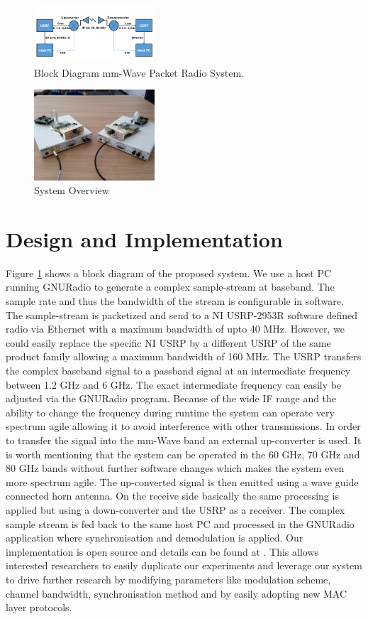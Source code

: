\documentclass{acm_proc_article-sp}
\begin{document}
\begin{figure}
\center
\includegraphics[width=0.4\textwidth]{block-diagram}
\caption{Block Diagram mm-Wave Packet Radio System.}
\label{fig:block}
\end{figure}
\begin{figure}
\center
\includegraphics[width=0.4\textwidth]{system}
\caption{System Overview}
\label{fig:system}
\end{figure}

\balancecolumns
\section{Design and Implementation}
Figure \ref{fig:block} shows a block diagram of the proposed system. 
We use a host PC running GNURadio \cite{gnuradio} to generate a complex sample-stream at baseband. The sample rate and thus the bandwidth of the stream is configurable in software. The sample-stream is packetized and send to a NI USRP-2953R \cite{ettus} software defined radio via Ethernet with a maximum bandwidth of upto 40 MHz. However, we could easily replace the specific NI USRP by a different USRP of the same product family allowing a maximum bandwidth of 160 MHz.
The USRP transfers the complex baseband signal to a passband signal at an intermediate frequency between 1.2 GHz and 6 GHz. The exact intermediate frequency can easily be adjusted via the GNURadio program. Because of the wide IF range and the ability to change the frequency during runtime the system can operate very spectrum agile allowing it to avoid interference with other transmissions.
In order to transfer the signal into the mm-Wave band an external up-converter is used. It is worth mentioning that the system can be operated in the 60 GHz, 70 GHz and 80 GHz bands without further software changes which makes the system even more spectrum agile.
The up-converted signal is then emitted using a wave guide connected horn antenna.
On the receive side basically the same processing is applied but using a down-converter and the USRP as a receiver. The complex sample stream is fed back to the same host PC and processed in the GNURadio application where synchronisation and demodulation is applied.
Our implementation is open source and details can be found at \cite{gr-inets}. This allows interested researchers to easily duplicate our experiments and leverage our system to drive further research by modifying parameters like modulation scheme, channel bandwidth, synchronisation method and by easily adopting new MAC layer protocols.
\end{document}
